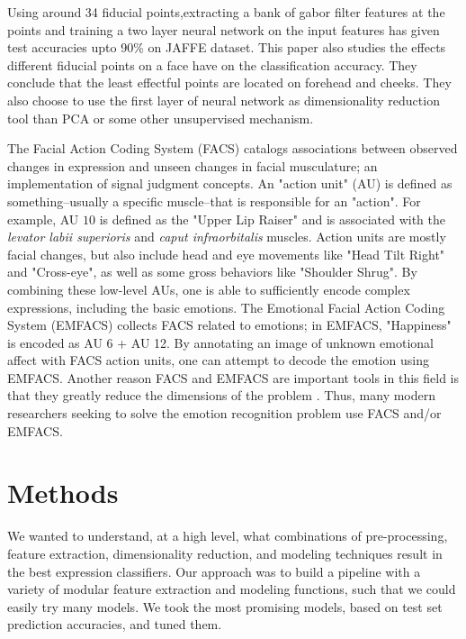 \documentclass[10pt,twocolumn,letterpaper]{article}
\begin{document}
Using around 34 fiducial points,extracting a bank of gabor filter features at the points and training a two layer neural network on the input features has given test accuracies upto 90\% on JAFFE dataset. This paper \cite{FERfeaturebased} also studies the effects different fiducial points on a face have on the classification accuracy. They conclude that the least effectful points are located on forehead and cheeks. They also choose to use the first layer of neural network as dimensionality reduction tool than PCA or some other unsupervised mechanism.   

The Facial Action Coding System (FACS) catalogs associations between observed changes in expression and unseen changes in facial musculature; an implementation of signal judgment concepts. An "action unit" (AU) is defined as something--usually a specific muscle--that is responsible for an "action". For example, AU $10$ is defined as the "Upper Lip Raiser" and is associated with the \textit{levator labii superioris} and \textit{caput infraorbitalis} muscles. Action units are mostly facial changes, but also include head and eye movements like "Head Tilt Right" and "Cross-eye", as well as some gross behaviors like "Shoulder Shrug". By combining these low-level AUs, one is able to sufficiently encode complex expressions, including the basic emotions. The Emotional Facial Action Coding System (EMFACS) collects FACS related to emotions; in EMFACS, "Happiness" is encoded as AU 6 + AU 12. By annotating an image of unknown emotional affect with FACS action units, one can attempt to decode the emotion using EMFACS. Another reason FACS and EMFACS are important tools in this field is that they greatly reduce the dimensions of the problem \cite{metastudy}. Thus, many modern researchers seeking to solve the emotion recognition problem use FACS and/or EMFACS.

\section{Methods}
We wanted to understand, at a high level, what combinations of pre-processing, feature extraction, dimensionality reduction, and modeling techniques result in the best expression classifiers. Our approach was to build a pipeline with a variety of modular feature extraction and modeling functions, such that we could easily try many models. We took the most promising models, based on test set prediction accuracies, and tuned them. 
\end{document}
